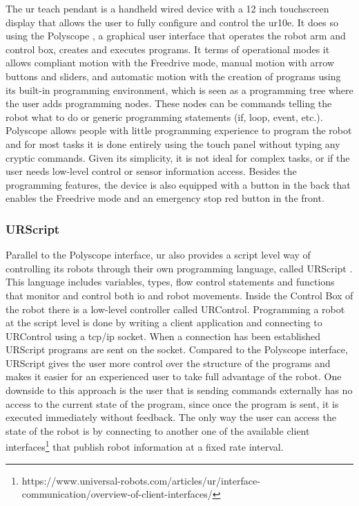 \par The \ac{ur} teach pendant is a handheld wired device with a 12 inch touchscreen display that allows the user to fully configure and control the \ac{ur10e}. It does so using the Polyscope \cite{ur10e.manual}, a graphical user interface that operates the robot arm and control box, creates and executes programs. It terms of operational modes it allows compliant motion with the Freedrive mode, manual motion with arrow buttons and sliders, and automatic motion with the creation of programs using its built-in programming environment, which is seen as a programming tree where the user adds programming nodes. These nodes can be commands telling the robot what to do or generic programming statements (if, loop, event, etc.). Polyscope allows people with little programming experience to program the robot and for most tasks it is done entirely using the touch panel without typing any cryptic commands. Given its simplicity, it is not ideal for complex tasks, or if the user needs low-level control or sensor information access. Besides the programming features, the device is also equipped with a button in the back that enables the Freedrive mode and an emergency stop red button in the front.

\subsubsection{URScript}

\par Parallel to the Polyscope interface, \ac{ur} also provides a script level way of controlling its robots through their own programming language, called URScript \cite{urscript.manual}. This language includes variables, types, flow control statements and functions that monitor and control both \acs{io} and robot movements. Inside the Control Box of the robot there is a low-level controller called URControl. Programming a robot at the script level is done by writing a client application and connecting to URControl using a \acs{tcp}/\acs{ip} socket. When a connection has been established URScript programs are sent on the socket. Compared to the Polyscope interface, URScript gives the user more control over the structure of the programs and makes it easier for an experienced user to take full advantage of the robot. One downside to this approach is the user that is sending commands externally has no access to the current state of the program, since once the program is sent, it is executed immediately without feedback. The only way the user can access the state of the robot is by connecting to another one of the available client interfaces\footnote{https://www.universal-robots.com/articles/ur/interface-communication/overview-of-client-interfaces/} that publish robot information at a fixed rate interval.

